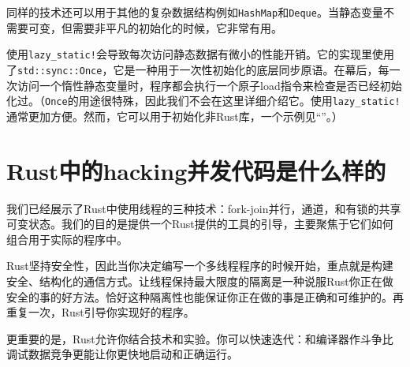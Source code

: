 同样的技术还可以用于其他的复杂数据结构例如\texttt{HashMap}和\texttt{Deque}。当静态变量不需要可变，但需要非平凡的初始化的时候，它非常有用。

使用\texttt{lazy\_static!}会导致每次访问静态数据有微小的性能开销。它的实现里使用了\texttt{std::sync::Once}，它是一种用于一次性初始化的底层同步原语。在幕后，每一次访问一个惰性静态变量时，程序都会执行一个原子load指令来检查是否已经初始化过。（\texttt{Once}的用途很特殊，因此我们不会在这里详细介绍它。使用\texttt{lazy\_static!}通常更加方便。然而，它可以用于初始化非Rust库，一个示例见“”。）

\section{Rust中的hacking并发代码是什么样的}

我们已经展示了Rust中使用线程的三种技术：fork-join并行，通道，和有锁的共享可变状态。我们的目的是提供一个Rust提供的工具的引导，主要聚焦于它们如何组合用于实际的程序中。

Rust坚持安全性，因此当你决定编写一个多线程程序的时候开始，重点就是构建安全、结构化的通信方式。让线程保持最大限度的隔离是一种说服Rust你正在做安全的事的好方法。恰好这种隔离性也能保证你正在做的事是正确和可维护的。再重复一次，Rust引导你实现好的程序。

更重要的是，Rust允许你结合技术和实验。你可以快速迭代：和编译器作斗争比调试数据竞争更能让你更快地启动和正确运行。
